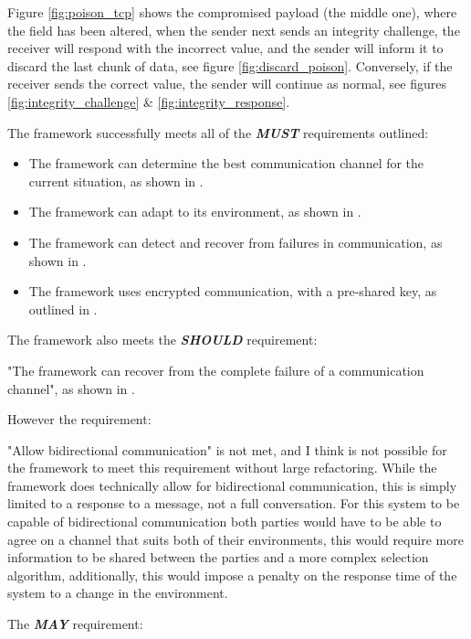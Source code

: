 Figure \ref{fig:poison_tcp} shows the compromised payload (the middle one), where the field has been altered, when the sender next sends an integrity challenge, the receiver will respond with the incorrect value, and the sender will inform it to discard the last chunk of data, see figure \ref{fig:discard_poison}. Conversely, if the receiver sends the correct value, the sender will continue as normal, see figures \ref{fig:integrity_challenge} \& \ref{fig:integrity_response}.

The framework successfully meets all of the \textit{\textbf{MUST}} requirements outlined:

\begin{itemize}
    \item The framework can determine the best communication channel for the current situation, as shown in .
    \item The framework can adapt to its environment, as shown in .
    \item The framework can detect and recover from failures in communication, as shown in .
    \item The framework uses encrypted communication, with a pre-shared key, as outlined in .
\end{itemize}

The framework also meets the \textit{\textbf{SHOULD}} requirement:

"The framework can recover from the complete failure of a communication channel", as shown in .

However the requirement:

"Allow bidirectional communication" is not met, and I think is not possible for the framework to meet this requirement without large refactoring. While the framework does technically allow for bidirectional communication, this is simply limited to a response to a message, not a full conversation. For this system to be capable of bidirectional communication both parties would have to be able to agree on a channel that suits both of their environments, this would require more information to be shared between the parties and a more complex selection algorithm, additionally, this would impose a penalty on the response time of the system to a change in the environment.

The \textit{\textbf{MAY}} requirement:

